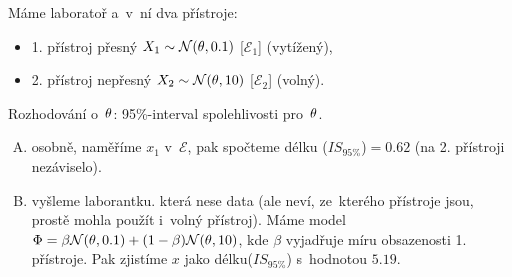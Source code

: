 \begin{example}
	Máme laboratoř a~v~ní dva přístroje:
	\begin{itemize}
		\item 1. přístroj přesný $X_1\sim\mathcal{N}(\theta,0.1)$ [$\mathcal{E}_1$] (vytížený),
		\item 2. přístroj nepřesný $X_2\sim\mathcal{N}(\theta,10)$ [$\mathcal{E}_2$] (volný).
	\end{itemize}
	Rozhodování o~$\theta$: 95\%-interval spolehlivosti pro~$\theta$.\begin{enumerate}[A)]
		\item osobně, naměříme $x_1$ v~$\mathcal{E}$, pak spočteme délku ($IS_{95\%}$)$=0.62$ (na 2. přístroji nezáviselo).
		\item vyšleme laborantku. která nese data (ale neví, ze~kterého přístroje jsou, prostě mohla použít i~volný přístroj). Máme model $\Phi=\beta\mathcal{N}(\theta,0.1)+(1-\beta)\mathcal{N}(\theta,10)$, kde $\beta$ vyjadřuje míru obsazenosti 1. přístroje. Pak zjistíme $x$ jako délku($IS_{95\%}$) s~hodnotou $5.19$.
	\end{enumerate}
\end{example}
